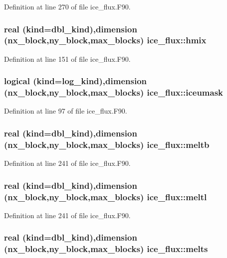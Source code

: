 Definition at line 270 of file ice\_\-flux.F90.\hypertarget{namespaceice__flux_ab583d7ec90095ce5df9f425a98b70dbd}{
\subsubsection[{hmix}]{\setlength{\rightskip}{0pt plus 5cm}real (kind=dbl\_\-kind),dimension (nx\_\-block,ny\_\-block,max\_\-blocks) {\bf ice\_\-flux::hmix}}}
\label{namespaceice__flux_ab583d7ec90095ce5df9f425a98b70dbd}


Definition at line 151 of file ice\_\-flux.F90.\hypertarget{namespaceice__flux_a2c8f3b751fc60ac7a93605e6bb887b0f}{
\subsubsection[{iceumask}]{\setlength{\rightskip}{0pt plus 5cm}logical (kind=log\_\-kind),dimension (nx\_\-block,ny\_\-block,max\_\-blocks) {\bf ice\_\-flux::iceumask}}}
\label{namespaceice__flux_a2c8f3b751fc60ac7a93605e6bb887b0f}


Definition at line 97 of file ice\_\-flux.F90.\hypertarget{namespaceice__flux_acdba57f616cfb780f910b8214a5b6121}{
\subsubsection[{meltb}]{\setlength{\rightskip}{0pt plus 5cm}real (kind=dbl\_\-kind),dimension (nx\_\-block,ny\_\-block,max\_\-blocks) {\bf ice\_\-flux::meltb}}}
\label{namespaceice__flux_acdba57f616cfb780f910b8214a5b6121}


Definition at line 241 of file ice\_\-flux.F90.\hypertarget{namespaceice__flux_a6aafbe05e11bff91bc937c605cf9d121}{
\subsubsection[{meltl}]{\setlength{\rightskip}{0pt plus 5cm}real (kind=dbl\_\-kind),dimension (nx\_\-block,ny\_\-block,max\_\-blocks) {\bf ice\_\-flux::meltl}}}
\label{namespaceice__flux_a6aafbe05e11bff91bc937c605cf9d121}


Definition at line 241 of file ice\_\-flux.F90.\hypertarget{namespaceice__flux_aae0e112fe38b436d979dc7fe86cdcb8f}{
\subsubsection[{melts}]{\setlength{\rightskip}{0pt plus 5cm}real (kind=dbl\_\-kind),dimension (nx\_\-block,ny\_\-block,max\_\-blocks) {\bf ice\_\-flux::melts}}}
\label{namespaceice__flux_aae0e112fe38b436d979dc7fe86cdcb8f}


